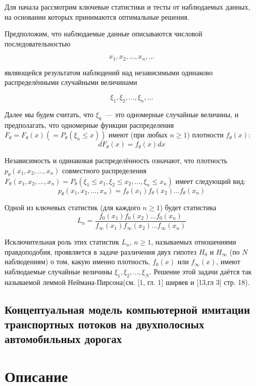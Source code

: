 \documentclass[a4paper,14pt]{article}
\begin{document}
Для начала рассмотрим ключевые статистики и тесты от наблюдаемых данных, на основании которых принимаются оптимальные решения. 

Предположим, что наблюдаемые данные описываются числовой последовательностью

$$
x_1, x_2, ..., x_n, ...
$$

являющейся результатом наблюдений над независимыми одинаково распределёнными случайными величинами 

$$
\xi_1, \xi_2, ..., \xi_n, ...
$$

Далее мы будем считать, что $\xi_k$~--- это одномерные случайные величины, и предполагать, что одномерные функции распределения $F_{\theta} = F_{\theta}(x) ( = P_{\theta} (\xi_n \leq x))$ имеют (при любых $n \geq 1$) плотности $f_\theta(x)$:
$$
dF_\theta(x) = f_\theta(x) dx
$$

Независимость и одинаковая распределённость означают, что плотность $p_\theta(x_1, x_2, ..., x_n)$ совместного распределения $F_\theta(x_1, x_2, ..., x_n) = P_\theta(\xi_1 \leq x_1, \xi_2 \leq x_2, ..., \xi_n \leq x_n)$ имеет следующий вид:
$$
p_\theta(x_1, x_2, ..., x_n) = f_\theta(x_1) f_\theta(x_2) ... f_\theta(x_n)
$$

Одной из ключевых статистик (для каждого $n \geq 1$) будет статистика 
$$
L_n = \frac{f_0(x_1) f_0(x_2) ... f_0(x_n)}{f_\infty(x_1) f_\infty(x_2) ... f_\infty(x_n)}
$$

Исключительная роль этих статистик $L_n$, $n \geq 1$, называемых отношениями правдоподобия, проявляется в задаче различения двух гипотез $H_0$ и $H_\infty$ (по $N$ наблюдениям) о том, какую именно плотность, $f_0(x)$ или $f_\infty(x)$, имеют наблюдаемые случайные величины $\xi_1, \xi_2, ..., \xi_N$. Решение этой задачи даётся так называемой леммой Неймана-Пирсона(см. [1, гл. 1] ширяев и [13,гл 3] стр. 18).

 
 
 
 
 
 
 
 
 
 


\subsection{Концептуальная модель компьютерной имитации транспортных потоков на двухполосных автомобильных дорогах}

\section{Описание }
\end{document}
